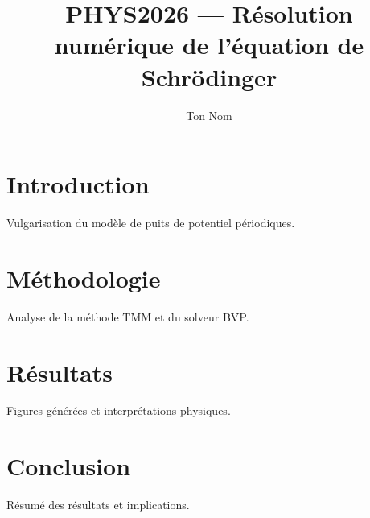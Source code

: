 \documentclass[a4paper,11pt]{article}
\title{PHYS2026 — Résolution numérique de l'équation de Schrödinger}
\author{Ton Nom}
\begin{document}
\maketitle

\section{Introduction}
Vulgarisation du modèle de puits de potentiel périodiques.

\section{Méthodologie}
Analyse de la méthode TMM et du solveur BVP.

\section{Résultats}
Figures générées et interprétations physiques.

\section{Conclusion}
Résumé des résultats et implications.
\end{document}
